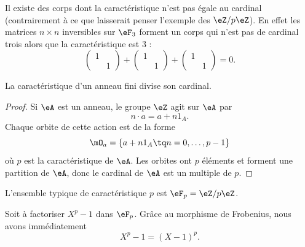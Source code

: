 \begin{example}
    Il existe des corps dont la caractéristique n'est pas égale au cardinal (contrairement à ce que laisserait penser l'exemple des \( \eZ/p\eZ\)). En effet les matrices \( n\times n\) inversibles sur \( \eF_{3}\) forment un corps qui n'est pas de cardinal trois alors que la caractéristique est \( 3\) :
    \begin{equation}
        \begin{pmatrix}
            1    &       \\ 
                &   1    
            \end{pmatrix}+\begin{pmatrix}
                1    &       \\ 
                    &   1    
                \end{pmatrix}+\begin{pmatrix}
                    1    &       \\ 
                        &   1    
                \end{pmatrix}=0.
    \end{equation}
\end{example}

\begin{proposition}     \label{PropGExaUK}
    La caractéristique d'un anneau fini divise son cardinal.
\end{proposition}

\begin{proof}
    Si \( \eA\) est un anneau, le groupe \( \eZ\) agit sur \( \eA\) par
    \begin{equation}
        n\cdot a=a+n1_A.
    \end{equation}
    Chaque orbite de cette action est de la forme
    \begin{equation}
        \mO_a=\{ a+n1_A\tq n=0,\ldots, p-1 \}
    \end{equation}
    où \( p\) est la caractéristique de \( \eA\). Les orbites ont \( p\) éléments et forment une partition de \( \eA\), donc le cardinal de \( \eA\) est un multiple de \( p\).
\end{proof}

L'ensemble typique de caractéristique \( p\) est \( \eF_p=\eZ/p\eZ\).
\begin{example}
    Soit à factoriser \( X^p-1\) dans \( \eF_p\). Grâce au morphisme de Frobenius, nous avons immédiatement
    \begin{equation}
        X^p-1=(X-1)^p.
    \end{equation}
\end{example}

